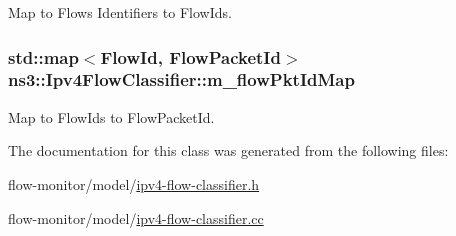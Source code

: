 Map to Flows Identifiers to Flow\+Ids. 

\subsubsection[{\texorpdfstring{m\+\_\+flow\+Pkt\+Id\+Map}{m_flowPktIdMap}}]{\setlength{\rightskip}{0pt plus 5cm}std\+::map$<${\bf Flow\+Id}, {\bf Flow\+Packet\+Id}$>$ ns3\+::\+Ipv4\+Flow\+Classifier\+::m\+\_\+flow\+Pkt\+Id\+Map\hspace{0.3cm}{\ttfamily [private]}}\hypertarget{classns3_1_1Ipv4FlowClassifier_a330e21b9b9926ab76ff354aa8ce8e2be}{}\label{classns3_1_1Ipv4FlowClassifier_a330e21b9b9926ab76ff354aa8ce8e2be}


Map to Flow\+Ids to Flow\+Packet\+Id. 



The documentation for this class was generated from the following files\+:\begin{DoxyCompactItemize}
\item 
flow-\/monitor/model/\hyperlink{ipv4-flow-classifier_8h}{ipv4-\/flow-\/classifier.\+h}\item 
flow-\/monitor/model/\hyperlink{ipv4-flow-classifier_8cc}{ipv4-\/flow-\/classifier.\+cc}\end{DoxyCompactItemize}
